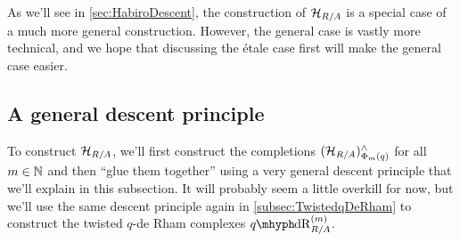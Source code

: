 \documentclass[DIV=12,numbers=enddot,leqno,bibliography=totoc]{scrartcl}
\begin{document}
	As we'll see in \cref{sec:HabiroDescent}, the construction of $\mathcal{H}_{R/A}$ is a special case of a much more general construction. However, the general case is vastly more technical, and we hope that discussing the étale case first will make the general case easier.
	
	\subsection{A general descent principle}\label{subsec:DescentPrinciple}
	To construct $\mathcal{H}_{R/A}$, we'll first construct the completions $(\mathcal{H}_{R/A})_{\Phi_m(q)}^\wedge$ for all $m\in\mathbb{N}$ and then \enquote{glue them together} using a very general descent principle that we'll explain in this subsection. It will probably seem a little overkill for now, but we'll use the same descent principle again in \cref{subsec:TwistedqDeRham} to construct the twisted $q$-de Rham complexes $\qdeRham_{R/A}^{(m)}$.
	
\end{document}
